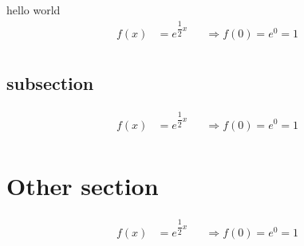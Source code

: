 \documentclass[10pt, a4paper]{article}
\begin{document}
hello world
{ \small
\begin{align*}
	f(x) & = e^{\dfrac{1}{2} x} &  & \Rightarrow f(0) = e^0 = 1 \\
\end{align*}
}

\subsection{subsection}
{ \small
\begin{align*}
	f(x) & = e^{\dfrac{1}{2} x} &  & \Rightarrow f(0) = e^0 = 1 \\
\end{align*}
}

\section{Other section}
{ \small
\begin{align*}
	f(x) & = e^{\dfrac{1}{2} x} &  & \Rightarrow f(0) = e^0 = 1 \\
\end{align*}
}
\end{document}
